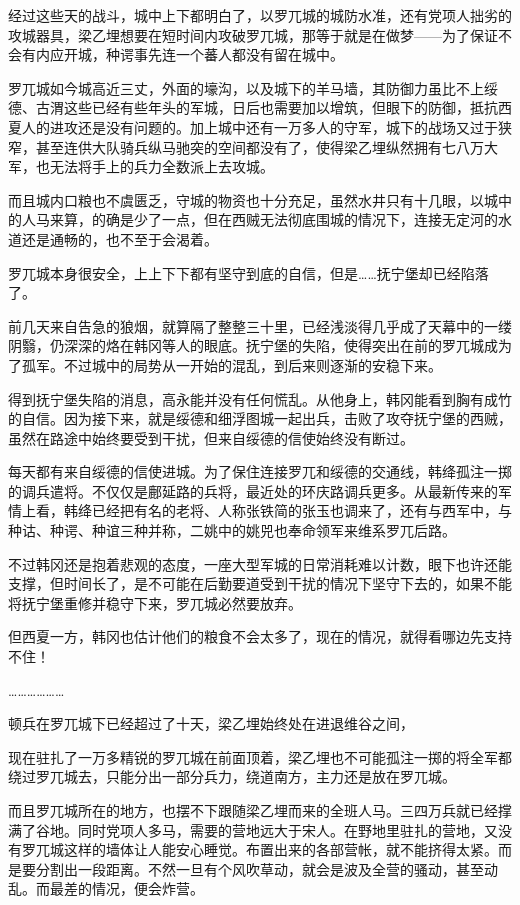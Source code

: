 经过这些天的战斗，城中上下都明白了，以罗兀城的城防水准，还有党项人拙劣的攻城器具，梁乙埋想要在短时间内攻破罗兀城，那等于就是在做梦——为了保证不会有内应开城，种谔事先连一个蕃人都没有留在城中。

罗兀城如今城高近三丈，外面的壕沟，以及城下的羊马墙，其防御力虽比不上绥德、古渭这些已经有些年头的军城，日后也需要加以增筑，但眼下的防御，抵抗西夏人的进攻还是没有问题的。加上城中还有一万多人的守军，城下的战场又过于狭窄，甚至连供大队骑兵纵马驰突的空间都没有了，使得梁乙埋纵然拥有七八万大军，也无法将手上的兵力全数派上去攻城。

而且城内口粮也不虞匮乏，守城的物资也十分充足，虽然水井只有十几眼，以城中的人马来算，的确是少了一点，但在西贼无法彻底围城的情况下，连接无定河的水道还是通畅的，也不至于会渴着。

罗兀城本身很安全，上上下下都有坚守到底的自信，但是……抚宁堡却已经陷落了。

前几天来自告急的狼烟，就算隔了整整三十里，已经浅淡得几乎成了天幕中的一缕阴翳，仍深深的烙在韩冈等人的眼底。抚宁堡的失陷，使得突出在前的罗兀城成为了孤军。不过城中的局势从一开始的混乱，到后来则逐渐的安稳下来。

得到抚宁堡失陷的消息，高永能并没有任何慌乱。从他身上，韩冈能看到胸有成竹的自信。因为接下来，就是绥德和细浮图城一起出兵，击败了攻夺抚宁堡的西贼，虽然在路途中始终要受到干扰，但来自绥德的信使始终没有断过。

每天都有来自绥德的信使进城。为了保住连接罗兀和绥德的交通线，韩绛孤注一掷的调兵遣将。不仅仅是鄜延路的兵将，最近处的环庆路调兵更多。从最新传来的军情上看，韩绛已经把有名的老将、人称张铁简的张玉也调来了，还有与西军中，与种诂、种谔、种谊三种并称，二姚中的姚兕也奉命领军来维系罗兀后路。

不过韩冈还是抱着悲观的态度，一座大型军城的日常消耗难以计数，眼下也许还能支撑，但时间长了，是不可能在后勤要道受到干扰的情况下坚守下去的，如果不能将抚宁堡重修并稳守下来，罗兀城必然要放弃。

但西夏一方，韩冈也估计他们的粮食不会太多了，现在的情况，就得看哪边先支持不住！

………………

顿兵在罗兀城下已经超过了十天，梁乙埋始终处在进退维谷之间，

现在驻扎了一万多精锐的罗兀城在前面顶着，梁乙埋也不可能孤注一掷的将全军都绕过罗兀城去，只能分出一部分兵力，绕道南方，主力还是放在罗兀城。

而且罗兀城所在的地方，也摆不下跟随梁乙埋而来的全班人马。三四万兵就已经撑满了谷地。同时党项人多马，需要的营地远大于宋人。在野地里驻扎的营地，又没有罗兀城这样的墙体让人能安心睡觉。布置出来的各部营帐，就不能挤得太紧。而是要分割出一段距离。不然一旦有个风吹草动，就会是波及全营的骚动，甚至动乱。而最差的情况，便会炸营。

